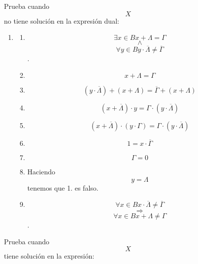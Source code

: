 \documentclass[
]{article}
\providecommand{\tightlist}{%
  \setlength{\itemsep}{0pt}\setlength{\parskip}{0pt}}
\begin{document}
\begin{enumerate}
\begin{enumerate}
\begin{enumerate}
\begin{enumerate}
\begin{enumerate}
          Prueba cuando \[X\] no tiene solución en la expresión dual:

          \begin{enumerate}
          \def\labelenumvi{\arabic{enumvi}.}
          \tightlist
          \item
            \begin{enumerate}
            \def\labelenumvii{\arabic{enumvii}.}
            \tightlist
            \item
              \[\exists{x \in B}{{x + \Lambda} = \Gamma}\]\[\land\]\[\forall{y \in B}{{y \cdot \overline{\Lambda}} \neq \overline{\Gamma}}\].
            \item
              \[{x + \Lambda} = \Gamma\]
            \item
              \[{\left( {y \cdot \overline{\Lambda}} \right) + \left( {x + \Lambda} \right)} = {\overline{\Gamma} + \left( {x + \Lambda} \right)}\]
            \item
              \[{\left( {x + \overline{\Lambda}} \right) \cdot y} = {\Gamma \cdot \left( {y \cdot \overline{\Lambda}} \right)}\]
            \item
              \[{\left( {x + \overline{\Lambda}} \right) \cdot {({y \cdot \Gamma})}} = {\Gamma \cdot \left( {y \cdot \overline{\Lambda}} \right)}\]
            \item
              \[1 = {x \cdot \overline{\Gamma}}\]
            \item
              \[\Gamma = 0\]
            \item
              Haciendo \[y = \Lambda\] tenemos que 1. es falso.
            \item
              \[\forall{x \in B}{{x \cdot \overline{\Lambda}} \neq \overline{\Gamma}}\]\[\Rightarrow\]\[\forall{x \in B}{{x + \Lambda} \neq \Gamma}\].
            \end{enumerate}
          \end{enumerate}

          Prueba cuando \[X\] tiene solución en la expresión:


\end{enumerate}
\end{enumerate}
\end{enumerate}
\end{enumerate}
\end{enumerate}
\end{document}

